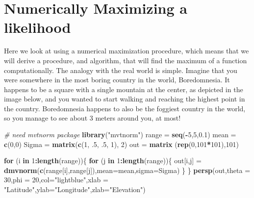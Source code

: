 \documentclass[
]{book}
\newenvironment{Shaded}{\begin{snugshade}}{\end{snugshade}}
\newcommand{\CommentTok}[1]{\textcolor[rgb]{0.56,0.35,0.01}{\textit{#1}}}
\newcommand{\ControlFlowTok}[1]{\textcolor[rgb]{0.13,0.29,0.53}{\textbf{#1}}}
\newcommand{\DataTypeTok}[1]{\textcolor[rgb]{0.13,0.29,0.53}{#1}}
\newcommand{\DecValTok}[1]{\textcolor[rgb]{0.00,0.00,0.81}{#1}}
\newcommand{\FloatTok}[1]{\textcolor[rgb]{0.00,0.00,0.81}{#1}}
\newcommand{\KeywordTok}[1]{\textcolor[rgb]{0.13,0.29,0.53}{\textbf{#1}}}
\newcommand{\NormalTok}[1]{#1}
\newcommand{\OperatorTok}[1]{\textcolor[rgb]{0.81,0.36,0.00}{\textbf{#1}}}
\newcommand{\StringTok}[1]{\textcolor[rgb]{0.31,0.60,0.02}{#1}}
\begin{document}
\hypertarget{numerically-maximizing-a-likelihood}{%
\section{Numerically Maximizing a likelihood}\label{numerically-maximizing-a-likelihood}}

Here we look at using a numerical maximization procedure, which means that we will derive a procedure, and algorithm, that will find the maximum of a function computationally. The analogy with the real world is simple. Imagine that you were somewhere in the most boring country in the world, Boredomnesia. It happens to be a square with a single mountain at the center, as depicted in the image below, and you wanted to start walking and reaching the highest point in the country. Boredomnesia happens to also be the foggiest country in the world, so you manage to see about 3 meters around you, at most!

\begin{Shaded}
\begin{Highlighting}[]
\CommentTok{# need mvtnorm package}
\KeywordTok{library}\NormalTok{(}\StringTok{"mvtnorm"}\NormalTok{)}
\NormalTok{range =}\StringTok{ }\KeywordTok{seq}\NormalTok{(}\OperatorTok{-}\DecValTok{5}\NormalTok{,}\DecValTok{5}\NormalTok{,}\FloatTok{0.1}\NormalTok{)}
\NormalTok{mean =}\StringTok{ }\KeywordTok{c}\NormalTok{(}\DecValTok{0}\NormalTok{,}\DecValTok{0}\NormalTok{)}
\NormalTok{Sigma =}\StringTok{ }\KeywordTok{matrix}\NormalTok{(}\KeywordTok{c}\NormalTok{(}\DecValTok{1}\NormalTok{, }\FloatTok{.5}\NormalTok{, }\FloatTok{.5}\NormalTok{, }\DecValTok{1}\NormalTok{), }\DecValTok{2}\NormalTok{)}
\NormalTok{out =}\StringTok{ }\KeywordTok{matrix}\NormalTok{ (}\KeywordTok{rep}\NormalTok{(}\DecValTok{0}\NormalTok{,}\DecValTok{101}\OperatorTok{*}\DecValTok{101}\NormalTok{),}\DecValTok{101}\NormalTok{)}

\ControlFlowTok{for}\NormalTok{ (i }\ControlFlowTok{in} \DecValTok{1}\OperatorTok{:}\KeywordTok{length}\NormalTok{(range))\{}
	\ControlFlowTok{for}\NormalTok{ (j }\ControlFlowTok{in} \DecValTok{1}\OperatorTok{:}\KeywordTok{length}\NormalTok{(range))\{}
\NormalTok{		out[i,j] =}\StringTok{ }\KeywordTok{dmvnorm}\NormalTok{(}\KeywordTok{c}\NormalTok{(range[i],range[j]),}\DataTypeTok{mean=}\NormalTok{mean,}\DataTypeTok{sigma=}\NormalTok{Sigma)}
\NormalTok{	\}}
\NormalTok{\}}
 \KeywordTok{persp}\NormalTok{(out,}\DataTypeTok{theta =} \DecValTok{30}\NormalTok{,}\DataTypeTok{phi =} \DecValTok{20}\NormalTok{,}\DataTypeTok{col=}\StringTok{"lightblue"}\NormalTok{,}\DataTypeTok{xlab =} \StringTok{"Latitude"}\NormalTok{,}\DataTypeTok{ylab=}\StringTok{"Longitude"}\NormalTok{,}\DataTypeTok{zlab=}\StringTok{"Elevation"}\NormalTok{)}
\end{Highlighting}
\end{Shaded}
\end{document}
